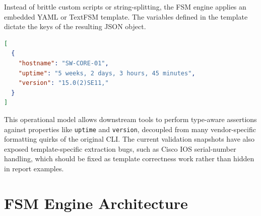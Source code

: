 \documentclass[a4paper,10pt]{article}
\begin{document}
Instead of brittle custom scripts or string-splitting, the \ac{FSM} engine applies an embedded YAML or TextFSM template. The variables defined in the template dictate the keys of the resulting \ac{JSON} object.

\begin{lstlisting}[language=json, title={Parsed Structured Output (excerpt)}]
[
  {
    "hostname": "SW-CORE-01",
    "uptime": "5 weeks, 2 days, 3 hours, 45 minutes",
    "version": "15.0(2)SE11,"
  }
]
\end{lstlisting}

This operational model allows downstream tools to perform type-aware assertions against properties like \texttt{uptime} and \texttt{version}, decoupled from many vendor-specific formatting quirks of the original CLI. The current validation snapshots have also exposed template-specific extraction bugs, such as Cisco IOS serial-number handling, which should be fixed as template correctness work rather than hidden in report examples.

\section{FSM Engine Architecture}
\label{sec:engine}
\end{document}
